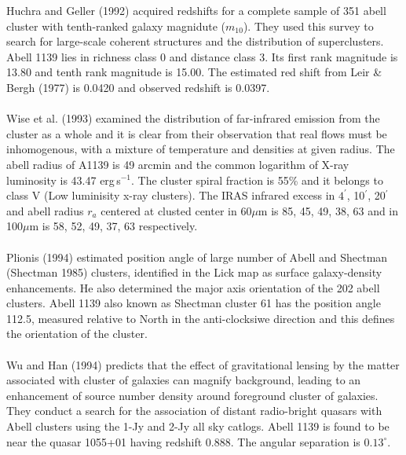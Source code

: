 Huchra and Geller (1992) acquired redshifts for a complete sample of 351 abell cluster with tenth-ranked galaxy magnidute ($m_{10}$). They used this survey to search for large-scale coherent structures and the distribution of superclusters. Abell 1139 lies in richness class 0 and distance class 3. Its first rank magnitude is 13.80 and tenth rank magnitude is 15.00. The estimated red shift from Leir \& Bergh (1977) is 0.0420 and observed redshift is 0.0397.\\\\
Wise et al. (1993) examined the distribution of far-infrared emission from the cluster as a whole and it is clear from their observation that real flows must be inhomogenous, with a mixture of temperature and densities at given radius. The abell radius of A1139 is 49 arcmin and the common logarithm of X-ray luminosity is 43.47 erg\,s$^{-1}$. The cluster spiral fraction is 55\% and it belongs to class V (Low luminisity x-ray clusters). The IRAS infrared excess in $4^{\prime}$, 10$^{\prime}$, 20$^{\prime}$ and abell radius $r_a$ centered at clusted center in 60$\mu$m is 85, 45, 49, 38, 63 and in 100$\mu$m is 58, 52, 49, 37, 63 respectively.\\\\
Plionis (1994) estimated position angle of large number of Abell and Shectman (Shectman 1985) clusters, identified in the Lick map as surface galaxy-density enhancements. He also determined the major axis orientation of the 202 abell clusters. Abell 1139 also known as Shectman cluster 61 has the position angle 112.5, measured relative to North in the anti-clocksiwe direction and this defines the orientation of the cluster.\\\\
Wu and Han (1994) predicts that the effect of gravitational lensing by the matter associated with cluster of galaxies can magnify background, leading to an enhancement of source number density around foreground cluster of galaxies. They conduct  a search for the association of distant radio-bright quasars with Abell clusters using the 1-Jy and 2-Jy all sky catlogs. Abell 1139 is found to be near the quasar 1055+01 having redshift 0.888. The angular separation is $0.13^{\circ}$.\\\\